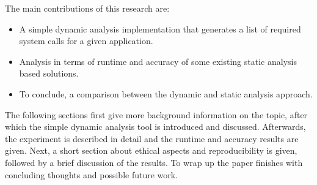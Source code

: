 The main contributions of this research are:
\begin{itemize}
    \item{A simple dynamic analysis implementation that generates a list of required system calls for a given application.}
    \item{Analysis in terms of runtime and accuracy of some existing static analysis based solutions.}
    \item{To conclude, a comparison between the dynamic and static analysis approach.}
\end{itemize}

The following sections first give more background information on the topic, after which the simple dynamic analysis tool is introduced and discussed.
Afterwards, the experiment is described in detail and the runtime and accuracy results are given.
Next, a short section about ethical aspects and reproducibility is given, followed by a brief discussion of the results.
To wrap up the paper finishes with concluding thoughts and possible future work.
